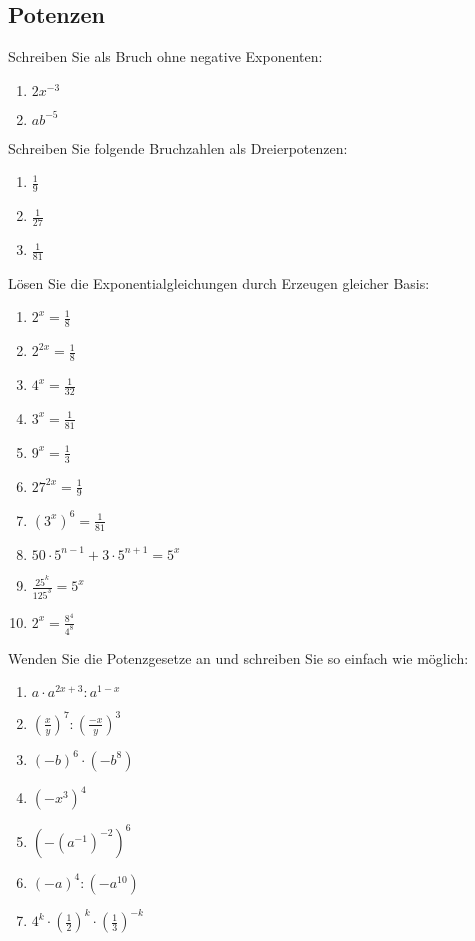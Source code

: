 \subsection{Potenzen}

Schreiben Sie als Bruch ohne negative Exponenten:

\begin{multicols}{2}
\begin{enumerate}[label=\alph*)]
\item $2x^{-3}$
  \item $ab^{-5}$
\end{enumerate}
\end{multicols}

Schreiben Sie folgende Bruchzahlen als Dreierpotenzen:

\begin{multicols}{2}
\begin{enumerate}[label=\alph*)]
  \item $\frac{1}{9}$
  \item $\frac{1}{27}$
    \item $\frac{1}{81}$
\end{enumerate}
\end{multicols}

Lösen Sie die Exponentialgleichungen durch Erzeugen gleicher Basis:

\begin{multicols}{3}
\begin{enumerate}[label=\alph*)]
\item $2^x=\frac{1}{8}$
\item $2^{2x}=\frac{1}{8}$
\item $4^x=\frac{1}{32}$
\item $3^x=\frac{1}{81}$
  \item $9^x=\frac{1}{3}$
  \item $27^{2x}=\frac{1}{9}$
  \item $\left(3^x\right)^6 = \frac{1}{81}$
    \item $50\cdot 5^{n-1} + 3\cdot 5^{n+1} = 5^x$
    \item $\frac{25^k}{125^3} = 5^x$
      \item $2^x=\frac{8^4}{4^8}$
\end{enumerate}
\end{multicols}


Wenden Sie die Potenzgesetze an und schreiben Sie so einfach wie
möglich:
\begin{multicols}{3}
\begin{enumerate}[label=\alph*)]
\item $a\cdot a^{2x+3} : a^{1-x}$
\item $\left(\frac{x}{y}\right)^7 : \left(\frac{-x}{y}\right)^3$
\item $(-b)^6 \cdot (-b^8)$
\item $(-x^3)^4$
\item $\left( -(a^{-1})^{-2} \right)^6$
\item $(-a)^4 : (-a^{10})$
  \item $4^k \cdot \left( \frac{1}{2} \right)^k \cdot \left(
    \frac{1}{3} \right)^{-k}$
\end{enumerate}
\end{multicols}


